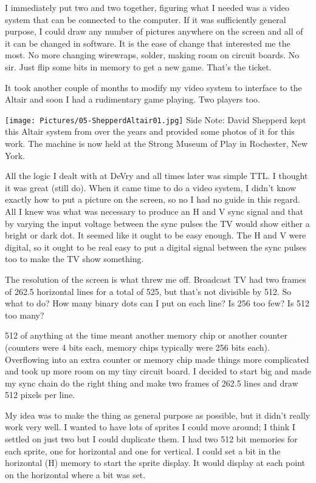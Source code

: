 I immediately put two and two together, figuring what I needed was a video system that can be connected to the computer. If it was sufficiently general purpose, I could draw any number of pictures anywhere on the screen and all of it can be changed in software. It is the ease of change that interested me the most. No more changing wirewraps, solder,  making room on circuit boards. No sir. Just flip some bits in memory to get a new game. That's the ticket.

It took another couple of months to modify my video system to interface to the Altair and soon I had a rudimentary game playing. Two players too.

\begin{tcolorbox}[]
    \texttt{[image: Pictures/05-ShepperdAltair01.jpg]}
    Side Note: David Shepperd kept this Altair system from over the years and provided some photos of it for this work. The machine is now held at the Strong Museum of Play in Rochester, New York.
\end{tcolorbox}

All the logic I dealt with at DeVry and all times later was simple TTL. I thought it was great (still do). When it came time to do a video system, I didn't know exactly how to put a picture on the screen, so no I had no guide in this regard. All I knew was what was necessary to produce an H and V sync signal and that by varying the input voltage between the sync pulses the TV would show either a bright or dark dot. It seemed like it ought to be easy enough. The H and V were digital, so it ought to be real easy to put a digital signal between the sync pulses too to make the TV show something.

The resolution of the screen is what threw me off. Broadcast TV had two frames of 262.5 horizontal lines for a total of 525, but that's not divisible by 512. So what to do? How many binary dots can I put on each line? Is 256 too few? Is 512 too many? 

512 of anything at the time meant another memory chip or another counter (counters were 4 bits each, memory chips typically were 256 bits each). Overflowing into an extra counter or memory chip made things more complicated and took up more room on my tiny circuit board. I decided to start big and made my sync chain do the right thing and make two frames of 262.5 lines and draw 512 pixels per line. 

My idea was to make the thing as general purpose as possible, but it didn't really work very well. I wanted to have lots of sprites I could move around; I think I settled on just two but I could duplicate them. I had two 512 bit memories for each sprite, one for horizontal and one for vertical. I could set a bit in the horizontal (H) memory to start the sprite display. It would display at each point on the horizontal where a bit was set. 

